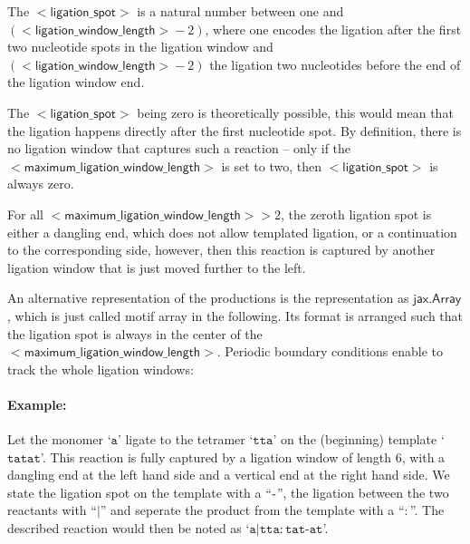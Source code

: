 The $\mathsf{<ligation\_spot>}$ is a natural number between one and 
$\left(\mathsf{<ligation\_window\_length>}-2\right)$, where one encodes the ligation after
the first two nucleotide spots in the ligation window and
$\left(\mathsf{<ligation\_window\_length>}-2\right)$ the ligation two nucleotides before the
end of the ligation window end.

The $\mathsf{<ligation\_spot>}$ being zero is theoretically possible, this
would mean that the ligation happens directly after the first nucleotide spot.
By definition, there is no ligation window that captures such a reaction 
-- only if the $\mathsf{<maximum\_ligation\_window\_length>}$ is set to two, then
$\mathsf{<ligation\_spot>}$ is always zero.

For all $\mathsf{<maximum\_ligation\_window\_length>}>2$, the zeroth ligation
spot is either a dangling end, which does not allow templated ligation, or a
continuation to the corresponding side, however, then this reaction is captured
by another ligation window that is just moved further to the left.

An alternative representation of the productions is the representation as
$\mathsf{jax.Array}$, which is just called motif array in the following.
Its format is arranged such that the ligation spot is always in the
center of the $\mathsf{<maximum\_ligation\_window\_length>}$.
Periodic boundary conditions enable to track the whole ligation windows:

\paragraph{Example:}
Let the monomer `$\mathtt{a}$' ligate to the tetramer `$\mathtt{tta}$' on the
(beginning) template `$\mathtt{tatat}$'.
This reaction is fully captured by a ligation window of length 6, with a
dangling end at the left hand side and a vertical end at the right hand side.
We state the ligation spot on the template with a ``$\text-$'',
the ligation between the two reactants with ``$|$''
and seperate the product from the template with a ``$:$''.
The described reaction would then be noted as
`$\mathtt{a|tta:tat\text{-}at}$'.

